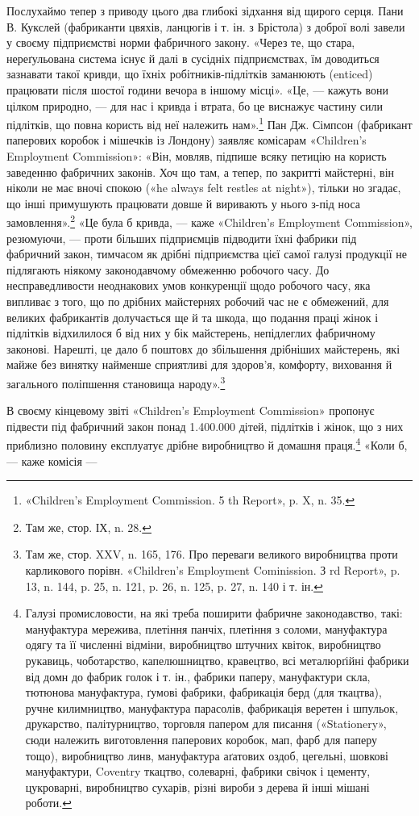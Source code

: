 \parcont{}  %
Послухаймо тепер з приводу цього два глибокі зідхання від щирого серця. Пани В. Кукслей (фабриканти
цвяхів, ланцюгів і т. ін. з Брістола) з доброї волі завели у своєму підприємстві норми фабричного
закону. «Через те, що стара, нереґульована система існує й далі в сусідніх підприємствах, їм
доводиться зазнавати такої кривди, що їхніх робітників-підлітків заманюють (enticed) працювати після
шостої години вечора в іншому місці». «Це, — кажуть вони цілком природно, — для нас і кривда і
втрата, бо це виснажує частину сили підлітків, що повна користь від неї належить нам».\footnote{
«Children's Employment Commission. 5 th Report», p. X, n. 35.
} Пан Дж.
Сімпсон (фабрикант паперових коробок і мішечків із Лондону) заявляє комісарам «Children’s Employment
Commission»: «Він, мовляв, підпише всяку петицію на користь заведенню фабричних законів. Хоч що там,
а тепер, по закритті майстерні, він ніколи не має вночі спокою («he always felt restles at night»),
тільки но згадає, що інші примушують працювати довше й виривають у нього з-під носа замовлення».\footnote{
Там же, стор. ІХ, n. 28.
}
«Це була б кривда, — каже «Children’s Employment Commission», резюмуючи, — проти більших підприємців
підводити їхні фабрики під фабричний закон, тимчасом як дрібні підприємства цієї самої галузі
продукції не підлягають ніякому законодавчому обмеженню робочого часу. До несправедливости
неоднакових умов конкуренції щодо робочого часу, яка випливає з того, що по дрібних майстернях
робочий час не є обмежений, для великих фабрикантів долучається ще й та шкода, що подання праці
жінок і підлітків відхилилося б від них у бік майстерень, непідлеглих фабричному законові. Нарешті,
це дало б поштовх до збільшення дрібніших майстерень, які майже без винятку найменше сприятливі для
здоров’я, комфорту, виховання й загального поліпшення становища народу».\footnote{
Там же, стор. XXV, n. 165, 176. Про переваги великого виробництва проти карликового порівн.
«Children’s Employment Cominission. З rd Report», p. 13, n. 144, p. 25, n. 121, p. 26, n. 125, p.
27, n. 140 і т. ін.
}

В своєму кінцевому звіті «Children’s Employment Commission» пропонує підвести під фабричний закон
понад 1.400.000 дітей, підлітків і жінок, що з них приблизно половину експлуатує дрібне виробництво
й домашня праця.\footnote{
Галузі промисловости, на які треба поширити фабричне законодавство, такі: мануфактура
мережива, плетіння панчіх, плетіння з соломи, мануфактура одягу та її численні відміни, виробництво
штучних квіток, виробництво рукавиць, чоботарство, капелюшництво, кравецтво, всі металюрґійні
фабрики від домн до фабрик голок і т. ін., фабрики паперу, мануфактури скла, тютюнова мануфактура,
ґумові фабрики, фабрикація берд (для ткацтва), ручне килимництво, мануфактура парасолів, фабрикація
веретен і шпульок, друкарство, палітурництво, торговля папером для писання («Stationery», сюди
належить виготовлення паперових коробок, мап, фарб для паперу тощо), виробництво линв, мануфактура
аґатових оздоб, цегельні, шовкові мануфактури, Coventry ткацтво, солеварні, фабрики свічок і
цементу, цукроварні, виробництво сухарів, різні вироби з дерева й інші мішані роботи.
} «Коли б, — каже комісія —
\parbreak{}  %
